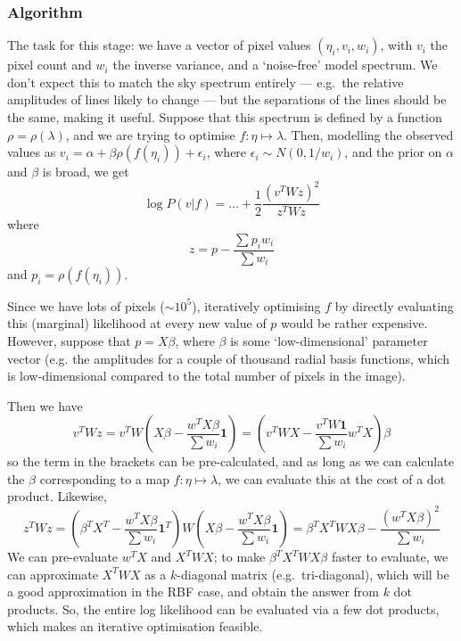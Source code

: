 \subsubsection{Algorithm}
\label{subsubsec:coarseAlignmentAlgorithm}

The task for this stage: we have a vector of pixel values $(\eta_i,
v_i, w_i)$, with $v_i$ the pixel count and $w_i$ the inverse variance,
and a `noise-free' model spectrum. We don't expect this to match the
sky spectrum entirely --- e.g.\ the relative amplitudes of lines 
likely to change --- but the separations of the lines should be the
same, making it useful. Suppose that this spectrum is defined by a function
$\rho = \rho(\lambda)$, and we are trying to optimise $f : \eta \mapsto
\lambda$. Then, modelling the observed values as $v_i = \alpha + \beta
\rho (f (\eta_i)) + \epsilon_i$, where $\epsilon_i \sim N(0,1/w_i)$, and
the prior on $\alpha$ and $\beta$ is broad, we get
\[
\log P(v|f) = \dots + \frac{1}{2} \frac{(v^T W z)^2}{z^T W z}
\]
where
\[
z = p - \frac{\sum p_i w_i}{\sum w_i}
\]
and $p_i = \rho (f (\eta_i))$.

Since we have lots of pixels ($\sim 10^5$), iteratively optimising $f$
by directly evaluating this (marginal) likelihood at every new value of $p$ would
be rather expensive. However, suppose that $p = X \beta$, where $\beta$
is some `low-dimensional' parameter vector (e.g. the amplitudes for a
couple of thousand radial basis functions, which is low-dimensional
compared to the total number of pixels in the image).

Then we have
\[
v^T W z = v^T W \left(X \beta - \frac{w^T X \beta}{\sum w_i}\mathbf{1}\right)
= \left(v^T W X - \frac{v^T W \mathbf{1}}{\sum w_i} w^T X\right) \beta
\]
so the term in the brackets can be pre-calculated, and as long as we can
calculate the $\beta$ corresponding to a map $f : \eta \mapsto \lambda$,
we can evaluate this at the cost of a dot product. Likewise,
\[
z^T W z = \left(\beta^T X^T - \frac{w^T X \beta}{\sum w_i} \mathbf{1}^T\right)
W \left(X \beta - \frac{w^T X \beta}{\sum w_i} \mathbf{1}\right)
= \beta^T X^T W X \beta - \frac{(w^T X \beta)^2}{\sum w_i}
\] 
We can pre-evaluate $w^T X$ and $X^T W X$; to make $\beta^T X^T
W X \beta$ faster to evaluate, we can approximate $X^T W X$ as a
$k$-diagonal matrix (e.g.\ tri-diagonal), which will be a good
approximation in the RBF case, and obtain the answer from $k$ dot
products. So, the entire log likelihood can be evaluated via a few dot
products, which makes an iterative optimisation feasible.

